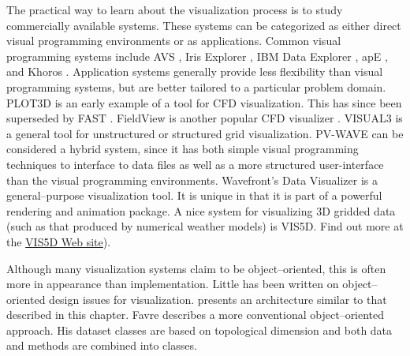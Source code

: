The practical way to learn about the visualization process is to study commercially available systems. These systems can be categorized as either direct visual programming environments or as applications. Common visual programming systems include AVS \cite{AVS89}, Iris Explorer \cite{IrisExplorer}, IBM Data Explorer \cite{DataExplorer}, apE \cite{apE90}, and Khoros \cite{Rasure91}. Application systems generally provide less flexibility than visual programming systems, but are better tailored to a particular problem domain. PLOT3D \cite{PLOT3D} is an early example of a tool for CFD visualization. This has since been superseded by FAST \cite{FAST90}. FieldView is another popular CFD visualizer \cite{FieldView91}. VISUAL3 \cite{VISUAL3} is a general tool for unstructured or structured grid visualization. PV-WAVE \cite{Charal90} can be considered a hybrid system, since it has both simple visual programming techniques to interface to data files as well as a more structured user-interface than the visual programming environments. Wavefront's Data Visualizer \cite{DataVisualizer} is a general--purpose visualization tool. It is unique in that it is part of a powerful rendering and animation package. A nice system for visualizing 3D gridded data (such as that produced by numerical weather models) is VIS5D. Find out more at the \href{http://www.ssec.wisc.edu/\~billh/vis5d.html}{VIS5D Web site}).

Although many visualization systems claim to be object--oriented, this is often more in appearance than implementation. Little has been written on object--oriented design issues for visualization. \cite{VISAGE92} presents an architecture similar to that described in this chapter. Favre \cite{Favre94} describes a more conventional object--oriented approach. His dataset classes are based on topological dimension and both data and methods are combined into classes.

\printbibliography

